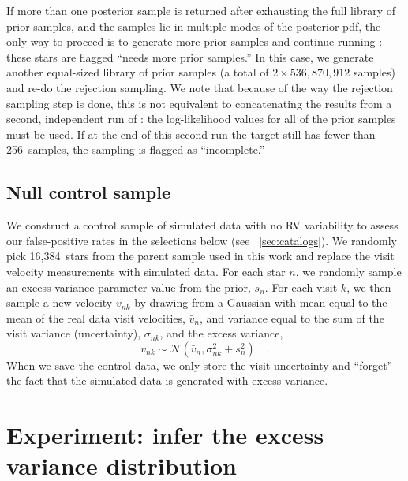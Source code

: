 \documentclass[modern, letterpaper]{aastex62}
\newcommand{\thejoker}{\project{The~Joker}}
\newcommand{\nprior}{536,870,912}
\newcommand{\nposterior}{256}
\newcommand{\ncontrol}{16,384}
\begin{document}
If more than one posterior sample is returned after exhausting the full library
of prior samples, and the samples lie in multiple modes of the posterior pdf,
the only way to proceed is to generate more prior samples and continue running
\thejoker: these stars are flagged ``needs more prior samples.''
In this case, we generate another equal-sized library of prior samples (a total
of $2\times\nprior$ samples) and re-do the rejection sampling.
We note that because of the way the rejection sampling step is done, this is not
equivalent to concatenating the results from a second, independent run of
\thejoker: the log-likelihood values for all of the prior samples must be used.
If at the end of this second run the target still has fewer than \nposterior\
samples, the sampling is flagged as ``incomplete.''

\subsection{Null control sample}
\label{sec:control-sample}

We construct a control sample of simulated data with no RV variability to assess
our false-positive rates in the selections below (see
\sectionname~\ref{sec:catalogs}).
We randomly pick \ncontrol\ stars from the parent sample used in this work and
replace the visit velocity measurements with simulated data.
For each star $n$, we randomly sample an excess variance parameter value from
the prior, $s_n$.
For each visit $k$, we then sample a new velocity $v_{nk}$ by drawing from a
Gaussian with mean equal to the mean of the real data visit velocities,
$\bar{v}_n$, and variance equal to the sum of the visit variance (uncertainty),
$\sigma_{nk}$, and the excess variance,
\begin{equation}
    v_{nk} \sim \mathcal{N}(\bar{v}_n, \sigma_{nk}^2 + s_n^2) \quad .
\end{equation}
When we save the control data, we only store the visit uncertainty and
``forget'' the fact that the simulated data is generated with excess variance.


%


\section{Experiment: infer the excess variance distribution}
\label{sec:inferjitter}
\end{document}
